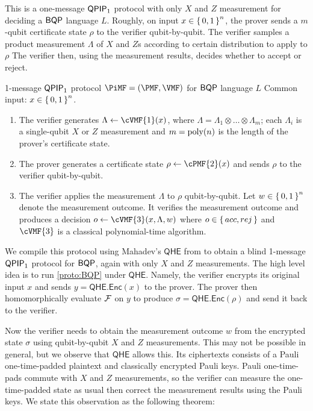 This is a one-message $\operatorname{\mathsf{QPIP}}_1$ protocol with only $X$ and $Z$ measurement for deciding a $\operatorname{\mathsf{BQP}}$ language $L$.
Roughly, on input $x\in\set{0,1}^n$, the prover sends a $m$-qubit certificate state $\rho$ to the verifier qubit-by-qubit.
The verifier samples a product measurement $\Lambda$ of $X$ and $Z$s according to certain distribution to apply to $\rho$
The verifier then, using the measurement results, decides whether to accept or reject.

\begin{protocol}{1-message $\operatorname{\mathsf{QPIP}}_1$ protocol $\PiMF = (\PMF, \VMF)$ for $\operatorname{\mathsf{BQP}}$ language $L$}
	\label{proto:BQP}
	Common input: $x\in\set{0,1}^n$. 
	\begin{enumerate}
		\item The verifier generates $\Lambda \leftarrow \cVMF{1}(x)$, where $\Lambda=\Lambda_1\otimes\ldots\otimes\Lambda_m$; each $\Lambda_i$ is a single-qubit $X$ or $Z$ measurement and $m=\operatorname*{\operatorname{poly}}(n)$ is the length of the prover's certificate state.
		\item The prover generates a certificate state $\rho\leftarrow\cPMF{2}(x)$  and sends $\rho$ to the verifier qubit-by-qubit.
		\item The verifier applies the measurement $\Lambda$ to $\rho$ qubit-by-qubit.
			Let $w \in \set{0,1}^n$ denote the measurement outcome.
			It verifies the measurement outcome and produces a decision $o\leftarrow\cVMF{3}(x, \Lambda, w)$ where $o\in\set{acc, rej}$ and $\cVMF{3}$ is a classical polynomial-time algorithm.
	\end{enumerate}
\end{protocol}

We compile this protocol using Mahadev's $\mathsf{QHE}$ from \cite{mahadev_qfhe} to obtain a blind 1-message $\operatorname{\mathsf{QPIP}}_1$ protocol for $\operatorname{\mathsf{BQP}}$, again with only $X$ and $Z$ measurements.
The high level idea is to run \cref{proto:BQP} under $\mathsf{QHE}$.
Namely, the verifier encrypts its original input $x$ and sends $y=\mathsf{QHE.Enc}(x)$ to the prover.
The prover then homomorphically evaluate $\mathcal{F}$ on $y$ to produce $\sigma=\mathsf{QHE.Enc}(\rho)$  and send it back to the verifier.

Now the verifier needs to obtain the measurement outcome $w$ from the encrypted state $\sigma$ using qubit-by-qubit $X$ and $Z$ measurements.
This may not be possible in general, but we observe that $\mathsf{QHE}$ allows this. 
Its ciphertexts consists of a Pauli one-time-padded plaintext and classically encrypted Pauli keys.
Pauli one-time-pads commute with $X$ and $Z$ measurements, so the verifier can measure the one-time-padded state as usual then correct the measurement results using the Pauli keys.
We state this observation as the following theorem:

